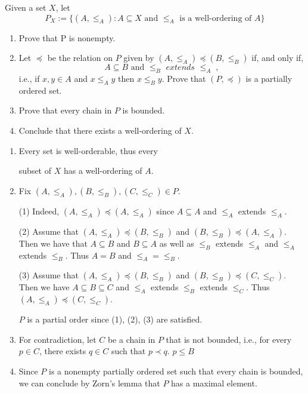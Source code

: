 \documentclass[../main.tex]{subfiles}
\begin{document}
\begin{problem}[7]
Given a set $X$, let
\[
	P_X := \{ (A, \le_A) : A \subseteq X \text{ and } \le_A \text{ is a well-ordering of } A \}
\]
\begin{enumerate}[label=(\alph*)]
	\item Prove that P is nonempty.
	\item Let $\preceq$ be the relation on $P$ given by $(A, \le_A) \preceq (B, \le_B)$ if, and only if,
	      \[
		      A \subseteq B \text{ and } \le_B \textit{ extends } \le_A \; ,
	      \]
	      i.e., if $x, y \in A$ and $x \le_A y$ then $x \le_B y$.
	      Prove that $(P, \preceq)$ is a partially ordered set.
	\item Prove that every chain in $P$ is bounded.
	\item Conclude that there exists a well-ordering of $X$.
\end{enumerate}
\end{problem}
\begin{enumerate}[label=(\alph*)]
	\item Every set is well-orderable, thus every

        subset of $X$ has a well-ordering of $A$.
	\item Fix $(A, \le_A), (B, \le_B), (C, \le_C) \in P$.

	      (1) Indeed, $(A, \le_A) \preceq (A, \le_A)$ since $A \subseteq A$ and $\le_A$ extends $\le_A$.

	      (2) Assume that $(A, \le_A) \preceq (B, \le_B)$ and $(B, \le_B) \preceq (A, \le_A)$.
	      Then we have that $A \subseteq B$ and $B \subseteq A$ as well as $\le_B$ extends $\le_A$ and $\le_A$ extends $\le_B$.
	      Thus $A = B$ and $\le_A = \le_B$.

	      (3) Assume that $(A, \le_A) \preceq (B, \le_B)$ and $(B, \le_B) \preceq (C, \le_C)$.
	      Then we have $A \subseteq B \subseteq C$ and $\le_A$ extends $\le_B$ extends $\le_C$.
	      Thus $(A, \le_A) \preceq (C, \le_C)$.

	      $P$ is a partial order since (1), (2), (3) are satisfied.
	\item For contradiction, let $C$ be a chain in $P$ that is not bounded, i.e.,
	      for every $p \in C$, there exists $q \in C$ such that $p \prec q$.
	      $p \le B$
	\item Since $P$ is a nonempty partially ordered set such that every chain is bounded, we can conclude by Zorn's lemma that $P$ has a maximal element.
\end{enumerate}
\end{document}
